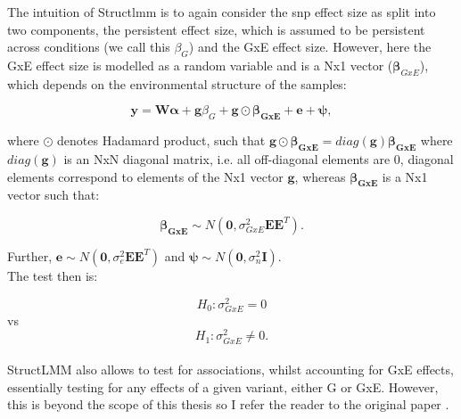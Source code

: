 The intuition of Struct\gls{lmm} is to again consider the \gls{snp} effect size as split into two components, the persistent effect size, which is assumed to be persistent across conditions (we call this $\beta_G$) and the GxE effect size. 
However, here the GxE effect size is modelled as a random variable and is a Nx1 vector ($\boldsymbol{\beta}_{GxE}$), which depends on the environmental structure of the samples:

\begin{equation}\label{eq:StructLMM-int}
 \mathbf{y} =  \mathbf{W}\boldsymbol{\alpha} + \mathbf{g}\beta_G + \mathbf{g} \odot \boldsymbol{\beta_{GxE}} + \mathbf{e} + \boldsymbol{\psi}, 
\end{equation}

where $\odot$ denotes Hadamard product, such that $\mathbf{g} \odot \boldsymbol{\beta_{GxE}} = diag(\mathbf{g})\boldsymbol{\beta_{GxE}}$ where $diag(\mathbf{g})$ is an NxN diagonal matrix, i.e. all off-diagonal elements are 0, diagonal elements correspond to elements of the Nx1 vector $\mathbf{g}$, whereas $\boldsymbol{\beta_{GxE}}$ is a Nx1 vector such that:

\begin{equation}\label{eq:StructLMM-int_beta_GxE}
    \boldsymbol{\beta_{GxE}} \sim N(\mathbf{0}, \sigma^2_{GxE}\mathbf{E}\mathbf{E}^T).
\end{equation}

Further, $\mathbf{e} \sim N(\mathbf{0}, \sigma^2_{e}\mathbf{E}\mathbf{E}^T)$ and $\boldsymbol{\psi} \sim N(\mathbf{0}, \sigma^2_{n}\mathbf{I})$. \\


The test then is:

\begin{equation}\label{eq:StructLMM-int_H0}
 H_{0}: \sigma^2_{GxE}=0 
\end{equation}
vs
\begin{equation}\label{eq:StructLMM-int_H1}
 H_{1}: \sigma^2_{GxE} \neq 0. 
\end{equation}\\

StructLMM also allows to test for associations, whilst accounting for GxE effects, essentially testing for any effects of a given variant, either G or GxE.
However, this is beyond the scope of this thesis so I refer the reader to the original paper \cite{moore2019linear}.\\

